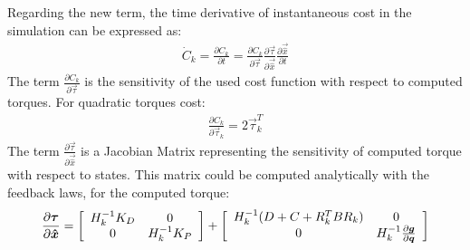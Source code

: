 Regarding the new term, the time derivative of instantaneous cost in the simulation can be expressed as:
%
\begin{align}
\dot{C}_k    = \frac{\partial C_k}{\partial t} = \frac{\partial C_k}{\partial \vec{\tau}} \frac{\partial \vec{\tau}}{\partial \vec{\hat{x}}} \frac{\partial \vec{\hat{x}}}{\partial t} 
\end{align}
%
The term $\frac{\partial C_k}{\partial \vec{\tau}}$ is the sensitivity of the used cost function with respect to computed torques. For quadratic torques cost:
%
\begin{align}
\frac{\partial C_k}{\partial \vec{\tau}_k} = 2\vec{\tau}_k^T
\end{align}
%
The term $\frac{\partial \vec{\tau}}{\partial \vec{\hat{x}}}$ is a Jacobian Matrix representing the sensitivity of computed torque with respect to states. This matrix could be computed analytically with the feedback laws, for the computed torque:
%
\begin{align}
\frac{\partial \vec{\tau}}{\partial \vec{\hat{x}}} = 
\left[ \begin{array}{c c}
	H_k^{-1} K_D & 0 \\ 0 & H_k^{-1} K_P
\end{array} \right] +
\left[ \begin{array}{c c}
	H_k^{-1} ( D + C + R_k^T B R_k ) & 0 \\ 0  & H_k^{-1} \frac{\partial \vec{g}}{\partial \vec{q}}
\end{array} \right] 
\end{align}
%


